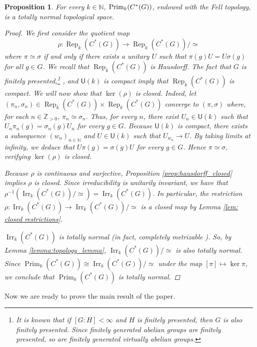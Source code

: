 \documentclass[11pt, twoside]{amsart}
\newcommand{\te}[1]{\operatorname{#1}}
\newcommand{\zn}{\mathbb{Z}}
\newcommand{\Rep}{\operatorname{Rep}}
\newcommand{\usf}{\textsf{U}}
\newtheorem{prop}[thm]{Proposition}
\theoremstyle{definition}
\newcommand{\B}{\mathbb}
\newcommand{\N}{\B{N}}
\begin{document}
\begin{prop}\label{prim_k_comp_normal}
   For every $k\in \N$, $\textnormal{Prim}_{k}(C^*(G))$, endowed with the Fell topology, is a totally normal topological space.
   \begin{proof}
       We first consider the quotient map $$\rho:\Rep_k(C^*(G))\to \Rep_k(C^*(G))/\simeq$$ 
       where $\pi\simeq \sigma$ if and only if there exists a unitary $U$ such that $\pi(g) U=U\sigma(g)$ for all $g\in G$. We recall that $\Rep_k(C^*(G))$ is Hausdorff. The fact that $G$ is finitely presented,\footnote{It is known that if $[G:H]<\infty$ and $H$ is finitely presented, then $G$ is also finitely presented. Since finitely generated abelian groups are finitely presented, so are finitely generated virtually abelian groups.} \cite[Lemma 2.5]{CW24}, and $\usf(k)$ is compact imply that $\Rep_k(C^*(G))$ is compact. We will now show that $\ker(\rho)$ is closed. Indeed, let $(\pi_n,\sigma_n)\in \te{Rep}_k(C^*(G))\times\te{Rep}_k(C^*(G))$ converge to $(\pi,\sigma)$ where, for each $n\in\zn_{>0}$, $\pi_n\simeq \sigma_n$. Thus, for every $n$, there exist $U_n \in \usf({k})$ such that $U_n\pi_n(g)=\sigma_n(g)U_n$ for every $g\in G$. Because $\usf({k})$ is compact, there exists a subsequence $(w_n)_{n\in \N}$ and $U\in \usf({k})$ such that $U_{w_n}\to U$. By taking limits at infinity, we deduce that $U\pi(g)=\sigma(g)U$ for every $g\in G$. Hence $\pi\simeq \sigma$, verifying $\ker(\rho)$ is closed. \par
       
       Because $\rho$ is continuous and surjective, Proposition \ref{prop:hausdorff_closed} implies $\rho$ is closed. Since irreducibility is unitarily invariant, we have that $\rho^{-1}(\te{Irr}_k(C^*(G))/\simeq)=\te{Irr}_k(C^*(G))$. In particular, the restriction $\rho: \te{Irr}_k(C^*(G))\to \te{Irr}_k(C^*(G))/\simeq$ is a closed map by Lemma \ref{lem: closed restrictions}. \par
       
      $\te{Irr}_{k}(C^*(G))$ is totally normal (in fact, completely metrizable \cite[3.7.4 (p.89)]{Dix77}). So, by Lemma \ref{lemma:topology_lemma}, $\te{Irr}_k(C^*(G))/\simeq$ is also totally normal. Since $\te{Prim}_k(C^*(G))\cong\te{Irr}_k(C^*(G))/\simeq$ under the map $[\pi]\mapsto\ker \pi$, we conclude that $\te{Prim}_k(C^*(G))$ is totally normal. \qedhere
     
   \end{proof}
 \end{prop}

   Now we are ready to prove the main result of the paper.  
     
\end{document}
